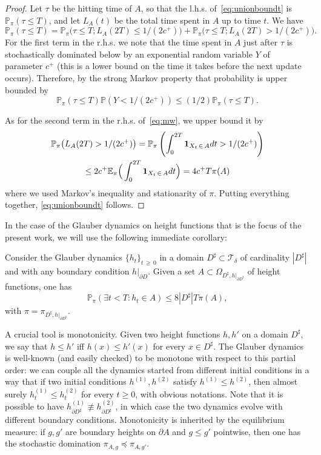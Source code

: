 \documentclass[AHL,Unicode,longabstracts,published]{cedram}
\newcommand{\E}{\mathbb{E}}
\renewcommand{\P}{\mathbb{P}}
\newcommand{\clT}{\mathcal{T}}
\renewcommand{\d}{{\sharp }}
\let\oldexists\exists
\renewcommand*{\exists}{\mathrel{\oldexists}}
\begin{document}
\begin{proof}
Let $\tau$ be the hitting time of $A$, so that the l.h.s. of~\eqref{eq:unionboundt} is $\P_\pi(\tau\le T)$, and let $L_A(t)$ be the total time spent in $A$ up to time $t$. We have
\begin{equation}\label{eq:mw}
\P_\pi(\tau\le T)=\P_\pi\big(\tau\le T;L_A(2T)\le 1/(2c^+)\big)+\P_\pi\big(\tau\le T;L_A(2T)> 1/(2c^+)\big).
\end{equation}
For the first term in the r.h.s. we note that the time spent in $A$ just after $\tau$ is stochastically dominated below by an exponential random variable $Y$ of parameter $c^+$ (this is a lower bound on the time it takes before the next update occurs). Therefore, by the strong Markov property that probability is upper bounded by
\begin{equation}
\P_\pi(\tau\le T)\P(Y<1/(2c^+))\le (1/2)\P_\pi(\tau\le T).
\end{equation}

As for the second term in the r.h.s. of~\eqref{eq:mw}, we upper bound it by
\begin{multline}
\P_\pi\big(L_A(2T)> 1/(2c^+)\big)= \P_\pi\left(\int_0^{2T}{\bf 1}_{X_t\,\in\,A}dt>1/(2c^+)
\right)\\
\le 2c^+\E_\pi\Big(\int_0^{2T}{\bf 1}_{X_t\,\in\,A}dt\Big)=4 c^+T\pi(A)
\end{multline}
where we used Markov's inequality and stationarity of $\pi$. Putting everything together, \eqref{eq:unionboundt} follows.
\end{proof}

In the case of the Glauber dynamics on height functions that is the focus of the present work, we will use the following immediate corollary:
\begin{coro}\label{cor:ubt}
Consider the Glauber dynamics $\{h_t\}_{t\,\ge\,0}$ in a domain $D^\d\subset \clT_\delta$ of cardinality $|D^\d|$ and with any boundary condition $h|_{\partial D}$. Given a set $A\subset \Omega_{D^\d,h|_{\partial D^\d}}$ of height functions, one has
\begin{equation}\label{eq:ubt}
\P_\pi\left(\exists t<T: h_t\in A\right)\le 8 |D^\d|T\pi(A),
\end{equation}
with $\pi=\pi_{D^\d,h|_{\partial D^\d}}$.
\end{coro}

A crucial tool is monotonicity. Given two height functions $h,h'$ on a domain $D^\d$, we say that $h\le h'$ iff $h(x)\le h'(x)$ for every $x\in D^\d$. The Glauber dynamics is well-known (and easily checked) to be monotone with respect to this partial order: we can couple all the dynamics started from different initial conditions in a way that if two initial conditions $h^{(1)},h^{(2)}$ satisfy $h^{(1)}\le h^{(2)}$, then almost surely $h^{(1)}_t\le h^{(2)}_t$ for every $t\ge0$, with obvious notations. Note that it is possible to have $h^{(1)}_{\partial D^\d}\not\equiv h^{(2)}_{\partial D^\d}$, in which case the two dynamics evolve with different boundary conditions. Monotonicity is inherited by the equilibrium measure: if $g,g'$ are boundary heights on $\partial A$ and $g\le g'$ pointwise, then one has the stochastic domination $\pi_{A,g}\preceq \pi_{A,g'}$.
\end{document}

